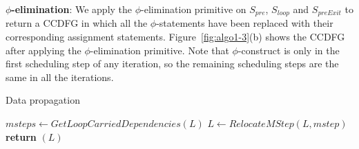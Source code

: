 {\bf $\phi$-elimination}: We apply the $\phi$-elimination primitive on $S_{pre}$, $S_{loop}$ and $S_{preExit}$ to return a CCDFG in which all the $\phi$-statements have been replaced with their corresponding assignment statements. Figure~\ref{fig:algo1-3}(b) shows the CCDFG after applying the $\phi$-elimination primitive. Note that $\phi$-construct is only in the first scheduling step of any iteration, so the remaining scheduling steps are the same in all the iterations.

\begin{algorithm}[t!]
\caption{Data propagation} 
\label{algo:data-propagation}
\begin{algorithmic}[1]
\State $msteps \leftarrow GetLoopCarriedDependencies(L)$
\State $L \leftarrow RelocateMStep (L, mstep)$
\EndIf
\EndFor
\State \textbf{return} $(L)$
\EndProcedure
\end{algorithmic}
\end{algorithm}

